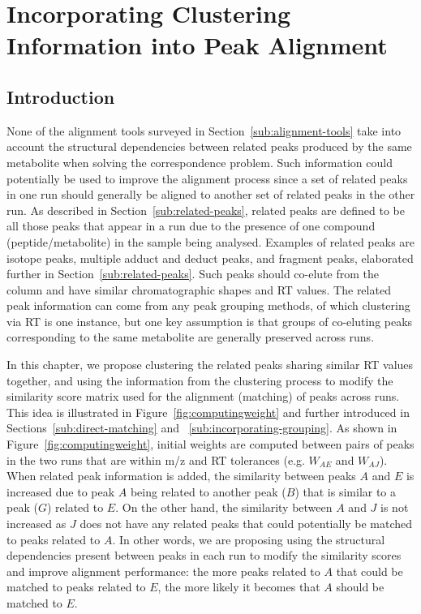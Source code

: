 \chapter{Incorporating Clustering Information into Peak Alignment}
\label{c:matching}

\section{Introduction}

None of the alignment tools surveyed in Section~\ref{sub:alignment-tools} take into account the structural dependencies between related peaks produced by the same metabolite when solving the correspondence problem. Such information could potentially be used to improve the alignment process since a set of related peaks in one run should generally be aligned to another set of related peaks in the other run. As described in Section~\ref{sub:related-peaks}, related peaks are defined to be all those peaks that appear in a run due to the presence of one compound (peptide/metabolite) in the sample being analysed. Examples of related peaks are isotope peaks, multiple adduct and deduct peaks, and fragment peaks, elaborated further in Section~\ref{sub:related-peaks}. Such peaks should co-elute from the column and have similar chromatographic shapes and RT values. The related peak information can come from any peak grouping methods, of which clustering via RT is one instance, but one key assumption is that groups of co-eluting peaks corresponding to the same metabolite are generally preserved across runs. 

In this chapter, we propose clustering the related peaks sharing similar RT values together, and using the information from the clustering process to modify the similarity score matrix used for the alignment (matching) of peaks across runs. This idea is illustrated in Figure~\ref{fig:computingweight} and further introduced in Sections~\ref{sub:direct-matching} and ~\ref{sub:incorporating-grouping}. As shown in Figure~\ref{fig:computingweight}, initial weights are computed between pairs of peaks in the two runs that are within m/z and RT tolerances (e.g. $W_{AE}$ and $W_{AJ}$). When related peak information is added, the similarity between peaks $A$ and $E$ is increased due to peak $A$ being related to another peak ($B$) that is similar to a peak ($G$) related to $E$. On the other hand, the similarity between $A$ and $J$ is not increased as $J$ does not have any related peaks that could potentially be matched to peaks related to $A$. In other words, we are proposing using the structural dependencies present between peaks in each run to modify the similarity scores and improve alignment performance: the more peaks related to $A$ that could be matched to peaks related to $E$, the more likely it becomes that $A$ should be matched to $E$. 

